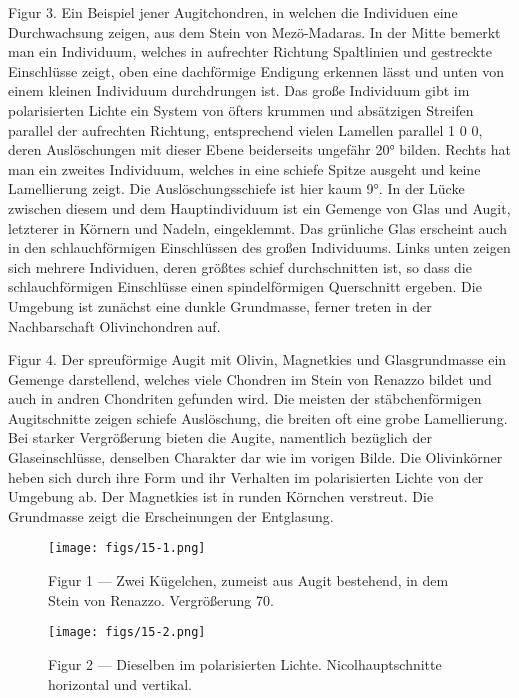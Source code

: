 \documentclass[a4paper, 12pt, oneside]{article}
\begin{document}
Figur 3. Ein Beispiel jener Augitchondren, in welchen die Individuen eine Durchwachsung zeigen, aus dem Stein von Mezö-Madaras. In der Mitte bemerkt man ein Individuum, welches in aufrechter Richtung Spaltlinien und gestreckte Einschlüsse zeigt, oben eine dachförmige Endigung erkennen lässt und unten von einem kleinen Individuum durchdrungen ist. Das große Individuum gibt im polarisierten Lichte ein System von öfters krummen und absätzigen Streifen parallel der aufrechten Richtung, entsprechend vielen Lamellen parallel 1 0 0, deren Auslöschungen mit dieser Ebene beiderseits ungefähr 20° bilden. Rechts hat man ein zweites Individuum, welches in eine schiefe Spitze ausgeht und keine Lamellierung zeigt. Die Auslöschungsschiefe ist hier kaum 9°. In der Lücke zwischen diesem und dem Hauptindividuum ist ein Gemenge von Glas und Augit, letzterer in Körnern und Nadeln, eingeklemmt. Das grünliche Glas erscheint auch in den schlauchförmigen Einschlüssen des großen Individuums. Links unten zeigen sich mehrere Individuen, deren größtes schief durchschnitten ist, so dass die schlauchförmigen Einschlüsse einen spindelförmigen Querschnitt ergeben. Die Umgebung ist zunächst eine dunkle Grundmasse, ferner treten in der Nachbarschaft Olivinchondren auf.

Figur 4. Der spreuförmige Augit mit Olivin, Magnetkies und Glasgrundmasse ein Gemenge darstellend, welches viele Chondren im Stein von Renazzo bildet und auch in andren Chondriten gefunden wird. Die meisten der stäbchenförmigen Augitschnitte zeigen schiefe Auslöschung, die breiten oft eine grobe Lamellierung. Bei starker Vergrößerung bieten die Augite, namentlich bezüglich der Glaseinschlüsse, denselben Charakter dar wie im vorigen Bilde. Die Olivinkörner heben sich durch ihre Form und ihr Verhalten im polarisierten Lichte von der Umgebung ab. Der Magnetkies ist in runden Körnchen verstreut. Die Grundmasse zeigt die Erscheinungen der Entglasung.
\clearpage

\vspace*{\fill}
\begin{figure}[H]
\centering
\texttt{[image: figs/15-1.png]}
\caption{\small Figur 1 --- Zwei Kügelchen, zumeist aus Augit bestehend, in dem Stein von Renazzo. Vergrößerung 70.}
\end{figure}
\vspace*{\fill}
\clearpage

\vspace*{\fill}
\begin{figure}[H]
\centering
\texttt{[image: figs/15-2.png]}
\caption{\small Figur 2 --- Dieselben im polarisierten Lichte. Nicolhauptschnitte horizontal und vertikal.}
\end{figure}
\vspace*{\fill}
\clearpage
\end{document}

